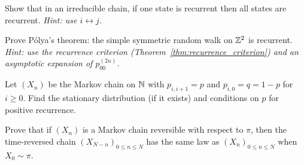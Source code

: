 \begin{exercise}
Show that in an irreducible chain, if one state is recurrent then all states
are recurrent. \emph{Hint: use $i \leftrightarrow j$.}
\end{exercise}

\begin{exercise}
Prove P\'olya's theorem: the simple symmetric random walk on $\mathbb{Z}^2$ is recurrent.
\emph{Hint: use the recurrence criterion (Theorem~\ref{thm:recurrence_criterion})
and an asymptotic expansion of $p_{00}^{(2n)}$.}
\end{exercise}

\begin{exercise}
Let $(X_n)$ be the Markov chain on $\mathbb{N}$ with $p_{i,i+1} = p$ and $p_{i,0} = q = 1-p$
for $i \geq 0$. Find the stationary distribution (if it exists) and conditions
on $p$ for positive recurrence.
\end{exercise}

\begin{exercise}
Prove that if $(X_n)$ is a Markov chain reversible with respect to $\pi$, then
the time-reversed chain $(X_{N-n})_{0 \leq n \leq N}$ has the same law as
$(X_n)_{0 \leq n \leq N}$ when $X_0 \sim \pi$.
\end{exercise}
